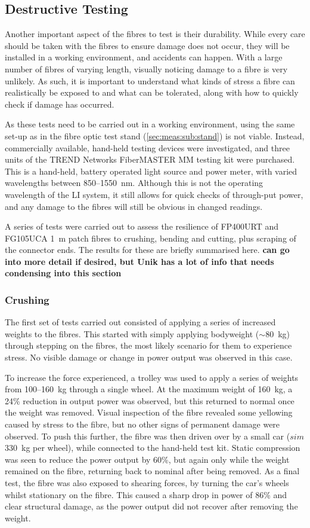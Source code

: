 \documentclass[a4paper,11pt]{article}
\let\oldsim\sim
\renewcommand{\sim}{{\oldsim}}
\begin{document}
\subsection{Destructive Testing}\label{sec:tests:sub:destruction}
Another important aspect of the fibres to test is their durability. While every care should be taken with the fibres to ensure damage does not occur, they will be installed in a working environment, and accidents can happen.  With a large number of fibres of varying length, visually noticing damage to a fibre is very unlikely. As such, it is important to understand what kinds of stress a fibre can realistically be exposed to and what can be tolerated, along with how to quickly check if damage has occurred.

As these tests need to be carried out in a working environment, using the same set-up as in the fibre optic test stand (\cref{sec:meas:sub:stand}) is not viable. Instead, commercially available, hand-held testing devices were investigated, and three units of the TREND Networks FiberMASTER MM testing kit \cite{bib:TREND} were purchased. This is a hand-held, battery operated light source and power meter, with varied wavelengths between 850--1550~nm. Although this is not the operating wavelength of the LI system, it still allows for quick checks of through-put power, and any damage to the fibres will still be obvious in changed readings.

A series of tests were carried out to assess the resilience of FP400URT and FG105UCA 1~m patch fibres to crushing, bending and cutting, plus scraping of the connector ends. The results for these are briefly summarised here. {\bf can go into more detail if desired, but Unik has a lot of info that needs condensing into this section}

\subsubsection{Crushing}
The first set of tests carried out consisted of applying a series of increased weights to the fibres. This started with simply applying bodyweight ($\sim80$~kg) through stepping on the fibres, the most likely scenario for them to experience stress. No visible damage or change in power output was observed in this case.

To increase the force experienced, a trolley was used to apply a series of weights from 100--160~kg through a single wheel. At the maximum weight of 160~kg, a 24\% reduction in output power was observed, but this returned to normal once the weight was removed. Visual inspection of the fibre revealed some yellowing caused by stress to the fibre, but no other signs of permanent damage were observed. To push this further, the fibre was then driven over by a small car ($sim$330~kg per wheel), while connected to the hand-held test kit. Static compression was seen to reduce the power output by 60\%, but again only while the weight remained on the fibre, returning back to nominal after being removed. As a final test, the fibre was also exposed to shearing forces, by turning the car's wheels whilst stationary on the fibre. This caused a sharp drop in power of 86\% and clear structural damage, as the power output did not recover after removing the weight.
\end{document}
